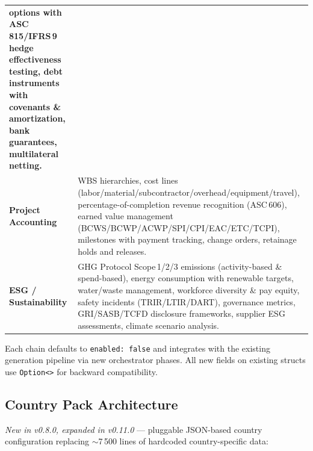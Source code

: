 \documentclass[11pt,a4paper]{article}
\begin{document}
\begin{tabularx}{\textwidth}{>{\bfseries\color{brand}}l X}
  options with ASC\,815/IFRS\,9 hedge effectiveness testing, debt instruments
  with covenants \& amortization, bank guarantees, multilateral netting. \\
Project Accounting &
  WBS hierarchies, cost lines (labor/material/subcontractor/overhead/equipment/travel),
  percentage-of-completion revenue recognition (ASC\,606), earned value
  management (BCWS/BCWP/ACWP/SPI/CPI/EAC/ETC/TCPI), milestones with
  payment tracking, change orders, retainage holds and releases. \\
ESG / Sustainability &
  GHG Protocol Scope\,1/2/3 emissions (activity-based \& spend-based),
  energy consumption with renewable targets, water/waste management,
  workforce diversity \& pay equity, safety incidents (TRIR/LTIR/DART),
  governance metrics, GRI/SASB/TCFD disclosure frameworks, supplier ESG
  assessments, climate scenario analysis. \\
\bottomrule
\end{tabularx}
\renewcommand{\arraystretch}{1.0}

\vspace{0.4em}
\noindent
Each chain defaults to \texttt{enabled: false} and integrates with the
existing generation pipeline via new orchestrator phases. All new fields
on existing structs use \texttt{Option<>} for backward compatibility.

\subsection{Country Pack Architecture}

\textit{New in v0.8.0, expanded in v0.11.0} --- pluggable JSON-based country configuration replacing
$\sim$7\,500 lines of hardcoded country-specific data:
\end{document}
